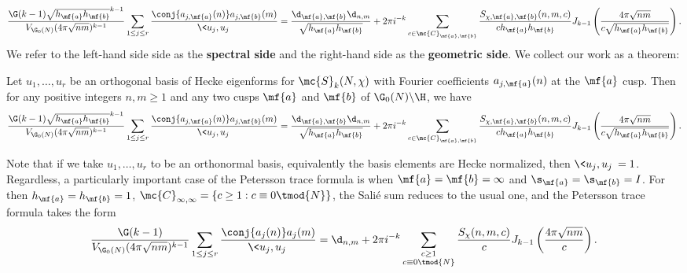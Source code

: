 \documentclass[12pt]{article}
\begin{document}
      \[
        \frac{\G(k-1)\sqrt{h_{\mf{a}}h_{\mf{b}}}^{k-1}}{V_{\G_{0}(N)}(4\pi\sqrt{nm})^{k-1}}\sum_{1 \le j \le r}\frac{\conj{a_{j,\mf{a}}(n)}a_{j,\mf{b}}(m)}{\<u_{j},u_{j}\>} = \frac{\d_{\mf{a},\mf{b}}\d_{n,m}}{\sqrt{h_{\mf{a}}h_{\mf{b}}}}+2\pi i^{-k}\sum_{c \in \mc{C}_{\mf{a},\mf{b}}}\frac{S_{\chi,\mf{a},\mf{b}}(n,m,c)}{ch_{\mf{a}}h_{\mf{b}}}J_{k-1}\left(\frac{4\pi\sqrt{nm}}{c\sqrt{h_{\mf{a}}h_{\mf{b}}}}\right).
      \]
      We refer to the left-hand side side as the \textbf{spectral side} and the right-hand side as the \textbf{geometric side}. We collect our work as a theorem:

      \begin{theorem*}
        Let \(u_{1},\ldots,u_{r}\) be an orthogonal basis of Hecke eigenforms for \(\mc{S}_{k}(N,\chi)\) with Fourier coefficients \(a_{j,
        \mf{a}}(n)\) at the \(\mf{a}\) cusp. Then for any positive integers \(n,m \ge 1\) and any two cusps \(\mf{a}\) and \(\mf{b}\) of \(\G_{0}(N)\backslash\H\), we have
        \[
          \frac{\G(k-1)\sqrt{h_{\mf{a}}h_{\mf{b}}}^{k-1}}{V_{\G_{0}(N)}(4\pi\sqrt{nm})^{k-1}}\sum_{1 \le j \le r}\frac{\conj{a_{j,\mf{a}}(n)}a_{j,\mf{b}}(m)}{\<u_{j},u_{j}\>} = \frac{\d_{\mf{a},\mf{b}}\d_{n,m}}{\sqrt{h_{\mf{a}}h_{\mf{b}}}}+2\pi i^{-k}\sum_{c \in \mc{C}_{\mf{a},\mf{b}}}\frac{S_{\chi,\mf{a},\mf{b}}(n,m,c)}{ch_{\mf{a}}h_{\mf{b}}}J_{k-1}\left(\frac{4\pi\sqrt{nm}}{c\sqrt{h_{\mf{a}}h_{\mf{b}}}}\right).
        \]
      \end{theorem*}
      
      Note that if we take \(u_{1},\ldots,u_{r}\) to be an orthonormal basis, equivalently the basis elements are Hecke normalized, then \(\<u_{j},u_{j}\> = 1\). Regardless, a particularly important case of the Petersson trace formula is when \(\mf{a} = \mf{b} = \infty\) and \(\s_{\mf{a}} = \s_{\mf{b}} = I\). For then \(h_{\mf{a}} = h_{\mf{b}} = 1\), \(\mc{C}_{\infty,\infty} = \{c \ge 1:c \equiv 0 \tmod{N}\}\), the Sali\'e sum reduces to the usual one, and the Petersson trace formula takes the form
      \[
        \frac{\G(k-1)}{V_{\G_{0}(N)}(4\pi \sqrt{nm})^{k-1}}\sum_{1 \le j \le r}\frac{\conj{a_{j}(n)}a_{j}(m)}{\<u_{j},u_{j}\>} = \d_{n,m}+2\pi i^{-k}\sum_{\substack{c \ge 1 \\ c \equiv 0 \tmod{N}}}\frac{S_{\chi}(n,m,c)}{c}J_{k-1}\left(\frac{4\pi\sqrt{nm}}{c}\right).
    \]
\fi
\end{document}
